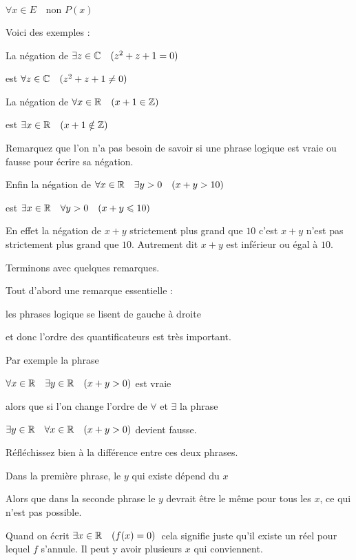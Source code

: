   \og $\forall x \in E \quad \text{non } P(x)$\fg


\change

Voici des exemples :


La négation de 
$\exists z \in \mathbb{C} \quad (z^2+z+1 = 0)$

est
$\forall z \in \mathbb{C} \quad (z^2+z+1 \neq 0)$

\change

La négation de 
$\forall x \in \mathbb{R} \quad  (x+1 \in \mathbb{Z})$


est
$\exists x \in \mathbb{R} \quad (x+1 \notin \mathbb{Z})$


Remarquez que l'on n'a pas besoin de savoir si une phrase logique est vraie ou fausse
pour écrire sa négation.

\change

Enfin la négation de 
$\forall x \in \mathbb{R} \quad \exists y >0 \quad (x+y > 10)$ 

est
$\exists x \in \mathbb{R} \quad \forall y > 0 \quad (x+y \leqslant 10)$

En effet la négation de $x+y$ strictement plus grand que $10$
c'est $x+y$ n'est pas strictement plus grand que $10$.
Autrement dit $x+y$ est inférieur ou égal à $10$.

\diapo

Terminons avec quelques remarques.

Tout d'abord une remarque essentielle :

les phrases logique se lisent de gauche à droite

et donc l'ordre des quantificateurs est très important.



Par exemple la phrase

$\forall x \in \mathbb{R} \quad  \exists y \in \mathbb{R} \quad (x+y>0)$ \quad est vraie

alors que si l'on change l'ordre de $\forall$ et $\exists$ 
la phrase 

$\exists y \in \mathbb{R} \quad \forall x \in \mathbb{R} \quad (x+y>0)$ devient fausse.

Réfléchissez bien à la différence entre ces deux phrases.

Dans la première phrase, le $y$ qui existe dépend du $x$ 

Alors que dans la seconde phrase le $y$ devrait être le même pour tous les $x$,
ce qui n'est pas possible.

\change


Quand on écrit \og $\exists x \in \mathbb{R} \quad (f(x)=0)$\fg\  cela 
signifie juste qu'il existe un réel pour lequel $f$ s'annule. Il peut y avoir 
plusieurs $x$ qui conviennent.

